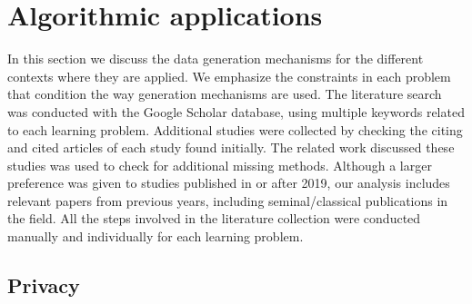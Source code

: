 % 
% 
% 
% 

\section{Algorithmic applications}\label{sec:algorithmic-applications-synth}

In this section we discuss the data generation mechanisms for the different
contexts where they are applied. We emphasize the constraints in each problem
that condition the way generation mechanisms are used. The literature search
was conducted with the Google Scholar database, using multiple keywords
related to each learning problem. Additional studies were collected by
checking the citing and cited articles of each study found initially. The
related work discussed these studies was used to check for additional missing
methods. Although a larger preference was given to studies published in or
after 2019, our analysis includes relevant papers from previous years,
including seminal/classical publications in the field. All the steps involved
in the literature collection were conducted manually and individually for each
learning problem.

\subsection{Privacy}\label{sec:data-privacy-synth}

